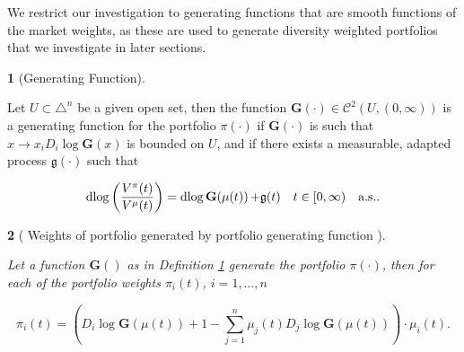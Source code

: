 \documentclass[british]{amsart} \usepackage{lmodern}
\numberwithin{equation}{section} \numberwithin{figure}{section}
\theoremstyle{plain} \newtheorem{thm}{\protect\theoremname}[section]
\theoremstyle{definition} \newtheorem{defn}[thm]{\protect\definitionname}
\theoremstyle{plain} \newtheorem{assumption}[thm]{\protect\assumptionname}
\theoremstyle{plain} \newtheorem{lem}[thm]{\protect\lemmaname}
\theoremstyle{plain} \newtheorem{prop}[thm]{\protect\propositionname}
\theoremstyle{remark} \newtheorem{rem}[thm]{\protect\remarkname}
\theoremstyle{plain} \newtheorem{cor}[thm]{\protect\corollaryname}
\renewcommand{\d}[1]{\mathop{\mathrm{d}{#1}}}
\newcommand{\rangei}{i=1,\dots,n} \newcommand{\measure}{\mathbb{P}}
\begin{document}
We restrict our investigation to generating functions that are smooth functions
of the market weights, as these are used to generate diversity weighted
portfolios that we investigate in later sections.

\newcommand{\G}[1]{\mathbf{G}(#1)}
\newcommand{\Gmu}{\G{\mu(t)}}
\newcommand{\g}{\mathfrak{g}(t)}

\begin{defn} [Generating Function] 
  \label{def:generatingfunction}

  Let $U \subset \triangle^{n}$ be a given open set, then the function
  $\G{\cdot} \in \mathcal{C}^{2}(U,(0,\infty))$ is a generating function for the
  portfolio $\pi(\cdot)$ if $\G{\cdot}$ is such that $x\to
  x_{i}D_{i}\log\G{x}$ is bounded on $U$, and if there exists a
  measurable, adapted process $\mathfrak{g}(\cdot)$ such that 

  \begin{equation}
    \d{ \log \left( \frac{V^{\pi}(t)}{V^{\mu}(t)} \right) } = 
    \d{\log{\Gmu}} + \g 
    \quad \ranget
    \quad \almostsurely.
  \end{equation}

\end{defn}

\begin{prop} [
  {\cite[Proposition 2.3.2]{vervuurt2015}}
  Weights of portfolio generated by portfolio generating function
  ]
  \label{prop:generatingfunction}

  Let a function $\G{}$ as in Definition \ref{def:generatingfunction}
  generate the portfolio $\pi(\cdot)$, then for each of the portfolio weights
  $\pi_{i}(t)$, $\rangei$

  \begin{equation}
    \label{eq:portfoliogeneratedbyG}
    \pi_{i}(t) = 
      \left( 
        D_{i}\log{\Gmu} + 1 -
          \sum_{j=1}^{n} \mu_{j}(t) D_{j} \log{\Gmu}
      \right) \cdot \mu_{i}(t).
  \end{equation}

\end{prop}
\end{document}
